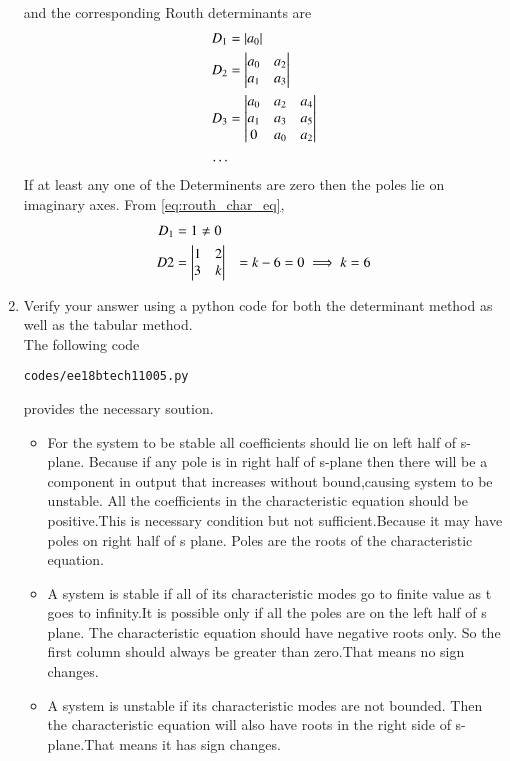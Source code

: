 \begin{enumerate}[label=\thesubsection.\arabic*.,ref=\thesubsection.\theenumi]
\begin{align}
\end{align}
and the corresponding Routh determinants are
\begin{align}
D_1 &= |a_0|
\\
D_2 &= 
\begin{vmatrix}
a_0 & a_2 
\\ 
a_1 & a_3
\end{vmatrix} 
\\
D_3 &=\begin{vmatrix}
a_0 & a_2 & a_4 
\\ a_1 & a_3 & a_5 
\\ 0 & a_0 & a_2\end{vmatrix}
\\
\dots
\end{align}
If at least any one of the Determinents are zero then the poles lie on imaginary axes.  From \eqref{eq:routh_char_eq},
%
\begin{align}
D_1 &= 1 \ne 0
\\
D2 &= \begin{vmatrix}
1 & 2 \\ 3 & k \end{vmatrix} 
&= k-6 =0 \implies k = 6
\end{align}
%
\item Verify your answer using a python code for both the determinant method as well as the tabular method.
\label{prob:ee18btech11005_python}
\\
\solution 
The following code 
%
\begin{lstlisting}
codes/ee18btech11005.py
\end{lstlisting}
%
provides the necessary soution.
\begin{itemize}
\item  For the system to be stable all coefficients should lie on left half of s-plane. Because if any pole is in right half of s-plane then there will be a component in output that increases without bound,causing system to be unstable.
All the coefficients in the characteristic equation should be positive.This is necessary condition but not sufficient.Because it may have poles on right half of s plane.
Poles are the roots of the characteristic equation.
    \item A system is stable if all of its characteristic modes go to finite value as t goes to infinity.It is possible only if all the poles are on the left half of s plane.
    The characteristic equation should have negative roots only. So the first column should always be greater than zero.That means no sign changes.
    \item A system is unstable if its characteristic modes are not bounded. Then the characteristic equation will also have roots in the right side of s-plane.That means it has sign changes.
    \end{itemize}

\end{enumerate}


